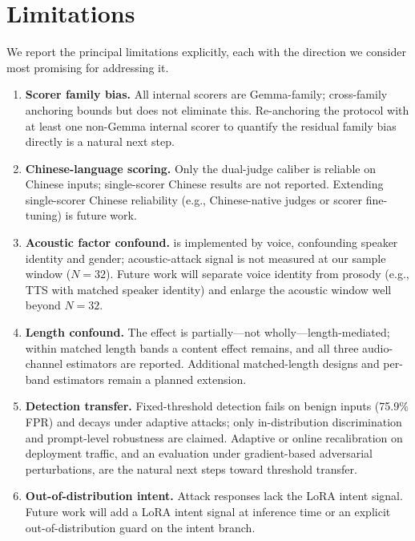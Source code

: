 \section{Limitations}
\label{sec:limitations}

We report the principal limitations explicitly, each with the direction we
consider most promising for addressing it.
\begin{enumerate}[label=(\roman*)]
  \item \textbf{Scorer family bias.} All internal scorers are Gemma-family;
        cross-family anchoring bounds but does not eliminate this. Re-anchoring
        the protocol with at least one non-Gemma internal scorer to quantify
        the residual family bias directly is a natural next step.
  \item \textbf{Chinese-language scoring.} Only the dual-judge caliber is
        reliable on Chinese inputs; single-scorer Chinese results are not
        reported. Extending single-scorer Chinese reliability (e.g.,
        Chinese-native judges or scorer fine-tuning) is future work.
  \item \textbf{Acoustic factor confound.} \Asfac{} is implemented by voice,
        confounding speaker identity and gender; acoustic-attack signal is not
        measured at our sample window ($N=32$). Future work will separate
        voice identity from prosody (e.g., TTS with matched speaker identity)
        and enlarge the acoustic window well beyond $N=32$.
  \item \textbf{Length confound.} The effect is partially---not
        wholly---length-mediated; within matched length bands a content effect
        remains, and all three audio-channel estimators are reported.
        Additional matched-length designs and per-band estimators remain a
        planned extension.
  \item \textbf{Detection transfer.} Fixed-threshold detection fails on benign
        inputs (75.9\% FPR) and decays under adaptive attacks; only
        in-distribution discrimination and prompt-level robustness are claimed.
        Adaptive or online recalibration on deployment traffic, and an
        evaluation under gradient-based adversarial perturbations, are the
        natural next steps toward threshold transfer.
  \item \textbf{Out-of-distribution intent.} Attack responses lack the LoRA
        intent signal. Future work will add a LoRA intent signal at inference
        time or an explicit out-of-distribution guard on the intent branch.

\end{enumerate}
